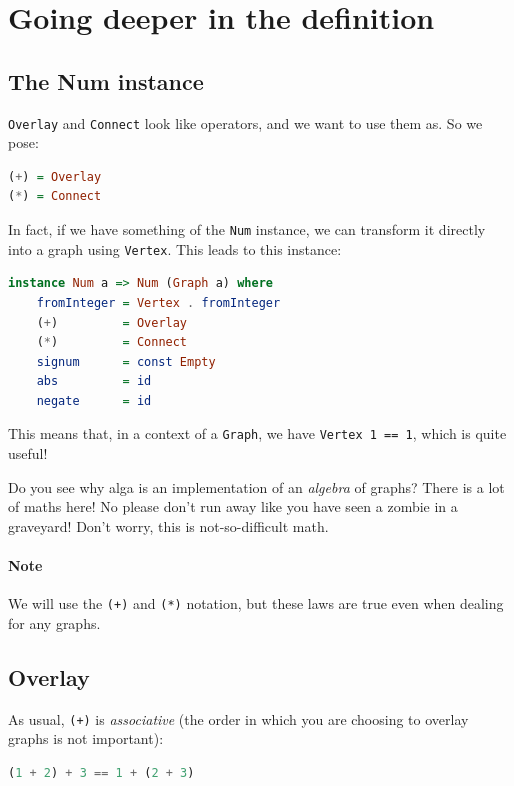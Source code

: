 \documentclass[10pt,a4paper]{article}
\begin{document}
\section{Going deeper in the definition}

\subsection{The Num instance}
\verb|Overlay| and \verb|Connect| look like operators, and we want to use them as. So we pose:

\begin{lstlisting}[language=Haskell, frame=single]
(+) = Overlay
(*) = Connect
\end{lstlisting}

In fact, if we have something of the \verb|Num| instance, we can transform it directly into a graph using \verb|Vertex|. This leads to this instance:

\begin{lstlisting}[language=Haskell, frame=single]
instance Num a => Num (Graph a) where
	fromInteger = Vertex . fromInteger
	(+)         = Overlay
	(*)         = Connect
	signum      = const Empty
	abs         = id
	negate      = id
\end{lstlisting}

This means that, in a context of a \verb|Graph|, we have \verb|Vertex 1 == 1|, which is quite useful!

Do you see why alga is an implementation of an \emph{algebra} of graphs? There is a lot of maths here! No please don't run away like you have seen a zombie in a graveyard!  Don't worry, this is not-so-difficult math.

\paragraph{Note}
We will use the \verb|(+)| and \verb|(*)| notation, but these laws are true even when dealing for any graphs.

\subsection{Overlay}

As usual, \verb|(+)| is \emph{associative} (the order in which you are choosing to overlay graphs is not important):
\begin{lstlisting}[language=Haskell, frame=single]
(1 + 2) + 3 == 1 + (2 + 3)
\end{lstlisting}
\end{document}
